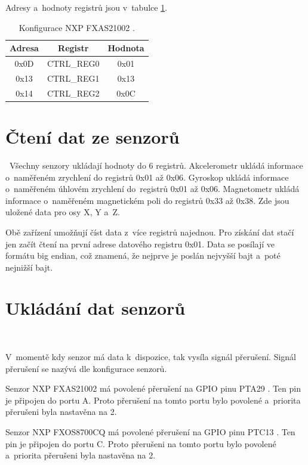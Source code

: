 Adresy a~hodnoty registrů jsou v~tabulce \ref{tab:FXAS21002}.

\begin{table}[!h]
    \centering
    \begin{tabular}{ccc}
        \hline
        \textbf{Adresa} & \textbf{Registr} & \textbf{Hodnota} \\
        \hline
        0x0D            & CTRL\_REG0       & 0x01             \\
        0x13            & CTRL\_REG1       & 0x13             \\
        0x14            & CTRL\_REG2       & 0x0C             \\
        \hline
    \end{tabular}
    \caption{Konfigurace NXP FXAS21002 \cite{FXAS21002}.}
    \label{tab:FXAS21002}
\end{table}

\section{Čtení dat ze senzorů}\
Všechny senzory ukládají hodnoty do 6 registrů. Akcelerometr ukládá informace
o~naměřeném zrychlení do registrů 0x01 až 0x06. Gyroskop ukládá informace 
o~naměřeném úhlovém zrychlení do~registrů 0x01 až 0x06. Magnetometr ukládá 
informace o~naměřeném magnetickém poli do registrů 0x33 až 0x38. Zde jsou 
uložené data pro osy X, Y a~Z.

Obě zařízení umožňují číst data z~více registrů najednou. Pro získání dat stačí jen
začít čtení na první adrese datového registru 0x01. Data se posílají ve formátu big
endian, což znamená, že nejprve je poslán nejvyšší bajt a~poté nejnižší bajt.

\section{Ukládání dat senzorů}\

V~momentě kdy senzor má data k~dispozice, tak vysíla signál přerušení. Signál přerušení se nazývá  dle konfigurace senzorů. 

Senzor NXP FXAS21002 má povolené přerušení na GPIO pinu PTA29 \cite{frdmk66UserGuide}. Ten pin je připojen do portu A. Proto přerušení na tomto portu bylo povolené a~priorita přerušeni byla nastavěna na 2.

Senzor NXP FXOS8700CQ má povolené přerušení na GPIO pinu PTC13 \cite{frdmk66UserGuide}. Ten pin je připojen do portu C. Proto přerušeni na tomto portu bylo povolené a~priorita přerušeni byla nastavěna na 2.

